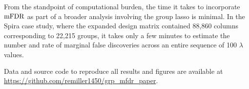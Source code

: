 From the standpoint of computational burden, the time it takes to incorporate $\textrm{mFDR}$ as part of a broader analysis involving the group lasso is minimal. In the Spira case study, where the expanded design matrix contained 88,860 columns corresponding to 22,215 groups, it takes only a few minutes to estimate the number and rate of marginal false discoveries across an entire sequence of 100 $\lambda$ values.

\bigskip


\noindent Data and source code to reproduce all results and figures are available at \url{https://github.com/remiller1450/grp_mfdr_paper}.

